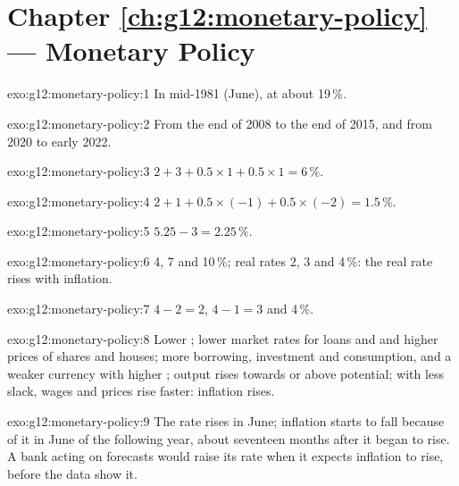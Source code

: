 \section*{Chapter \ref{ch:g12:monetary-policy} --- Monetary Policy}

\begin{solution}{exo:g12:monetary-policy:1}
In mid-1981 (June), at about 19\,\%.
\end{solution}

\begin{solution}{exo:g12:monetary-policy:2}
From the end of 2008 to the end of 2015, and from 2020 to early 2022.
\end{solution}

\begin{solution}{exo:g12:monetary-policy:3}
$2 + 3 + 0.5 \times 1 + 0.5 \times 1 = 6\,\%$.
\end{solution}

\begin{solution}{exo:g12:monetary-policy:4}
$2 + 1 + 0.5 \times (-1) + 0.5 \times (-2) = 1.5\,\%$.
\end{solution}

\begin{solution}{exo:g12:monetary-policy:5}
$5.25 - 3 = 2.25\,\%$.
\end{solution}

\begin{solution}{exo:g12:monetary-policy:6}
4, 7 and 10\,\%; real rates 2, 3 and 4\,\%: the real rate rises with inflation.
\end{solution}

\begin{solution}{exo:g12:monetary-policy:7}
$4 - 2 = 2$, $4 - 1 = 3$ and 4\,\%.
\end{solution}

\begin{solution}{exo:g12:monetary-policy:8}
Lower ; lower market rates for loans and  and higher prices of shares and houses; more borrowing, investment and consumption, and a weaker currency
with higher ; output rises towards or above potential; with less slack, wages and prices rise faster: inflation rises.
\end{solution}

\begin{solution}{exo:g12:monetary-policy:9}
The rate rises in June; inflation starts to fall because of it in June of the following year, about seventeen months after it began to rise. A bank acting on forecasts
would raise its rate when it expects inflation to rise, before the data show it.
\end{solution}

